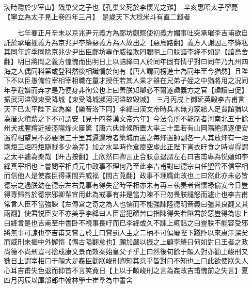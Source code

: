 渤時隱於少室山】戣巢父之子也【孔巢父死於李懷光之難】　辛亥惠昭太子寧薨【寧立為太子見上卷四年三月】　是歲天下大稔米斗有直二錢者

　　七年春正月辛未以京兆尹元義方為鄜坊觀察使初義方媚事吐突承璀李吉甫欲自託於承璀擢義方為京兆尹李絳惡義方為人故出之【惡烏路翻】義方入謝因言李絳私其同年許季同除京兆少尹出臣鄜坊專作威福欺罔聰明上曰朕諳李絳不如是【諳烏舍翻】明日將問之義方惶愧而出明日上以詰絳曰人於同年固有情乎對曰同年乃九州四海之人偶同科第或登科然後相識情於何有【唐人謂同榜進士為同年至今猶然】且陛下不以臣愚備位宰相宰相職在量才授任若其人果才雖在兄弟子姪之中猶將用之况同年乎避嫌而弃才是乃便身非徇公也上曰善朕知卿必不爾遂趣義方之官【趣讀曰促】　振武河溢毁東受降城【東受降城瀕河河溢故毀城】　三月丙戌上御延英殿李吉甫言天下已太平陛下宜為樂【樂音洛下同】李絳曰漢文帝時兵木無刃家給人足賈誼猶以為厝火積薪之下不可謂安【見十四卷漢文帝六年】今法令所不能制者河南北五十餘州犬戎腥羶近接涇隴烽火屢驚【唐六典烽候所置大率三十里若有山岡隔絶須逐便安置得相望見不必要限三十里其逼邊境者築城而置之每烽置帥副各一人其放烽有一炬兩炬三炬四炬隨賊多少為差】加之水旱時作倉廩空虛此正陛下宵衣旰食之時豈得謂之太平遽為樂哉【旰古按翻】上欣然曰卿言正合朕意退謂左右曰吉甫專為悦媚如李絳真宰相也上嘗問宰相貞元中政事不理何乃至此李吉甫對曰德宗自任聖智不信宰相而信他人是使姦臣得乘間弄威福【間古莧翻】政事不理職此故也上曰然此亦未必皆德宗之過朕幼在德宗左右見事有得失當時宰相亦未有再三執奏者皆懷禄偷安今日豈得專歸咎於德宗邪卿輩宜用此為戒事有非是當力陳不已勿畏朕譴怒而遽止也李吉甫常言人臣不當強諫【左傳宫之奇之為人也懦而不能強諫陸德明音義曰彊其良翻又其兩翻】使君悦臣安不亦美乎李絳曰人臣當犯顔苦口指陳得失若陷君於惡豈得為忠上曰絳言是也吉甫至中書卧不視事長吁而已李絳或久不諫上輒詰之曰豈朕不能容受邪將無事可諫也李吉甫又嘗言於上曰賞罰人主之二柄不可偏廢陛下踐阼以來惠澤深矣而威刑未振中外懈惰【懈古隘翻怠也】願加嚴以振之上顧李絳曰何如對曰王者之政尚德不尚刑豈可捨成康文景而效秦始皇父子乎上曰然後旬餘于頔入對亦勸上峻刑又數日上謂宰相曰于頔大是姦臣勸朕峻刑卿知其意乎皆對曰不知也上曰此欲使朕失人心耳吉甫失色退而抑首不言笑竟日【上以于頔峻刑之言為姦故吉甫愧前之失言】夏四月丙辰以庫部郎中翰林學士崔羣為中書舍


